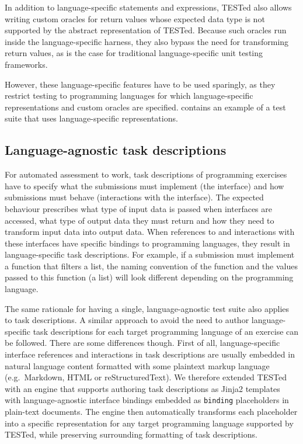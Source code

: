 \documentclass[../main]{subfiles}
\begin{document}
In addition to language-specific statements and expressions, TESTed also allows writing custom oracles for return values whose expected data type is not supported by the abstract representation of TESTed.
Because such oracles run inside the language-specific harness, they also bypass the need for transforming return values, as is the case for traditional language-specific unit testing frameworks.

However, these language-specific features have to be used sparingly, as they restrict testing to programming languages for which language-specific representations and custom oracles are specified.
 contains an example of a test suite that uses language-specific representations.

\subsection{Language-agnostic task descriptions}\label{subsec:dsl-language-agnostic-task-descriptions}

For automated assessment to work, task descriptions of programming exercises have to specify what the submissions must implement (the interface) and how submissions must behave (interactions with the interface).
The expected behaviour prescribes what type of input data is passed when interfaces are accessed, what type of output data they must return and how they need to transform input data into output data.
When references to and interactions with these interfaces have specific bindings to programming languages, they result in language-specific task descriptions.
For example, if a submission must implement a function that filters a list, the naming convention of the function and the values passed to this function (a list) will look different depending on the programming language.

The same rationale for having a single, language-agnostic test suite also applies to task descriptions.
A similar approach to avoid the need to author language-specific task descriptions for each target programming language of an exercise can be followed.
There are some differences though.
First of all, language-specific interface references and interactions in task descriptions are usually embedded in natural language content formatted with some plaintext markup language (e.g.\ Markdown, HTML or reStructuredText).
We therefore extended TESTed with an engine that supports authoring task descriptions as Jinja2 templates~\autocite{ronacherJinja22022} with language-agnostic interface bindings embedded as \texttt{{{binding}}} placeholders in plain-text documents.
The engine then automatically transforms each placeholder into a specific representation for any target programming language supported by TESTed, while preserving surrounding formatting of task descriptions.
\end{document}
